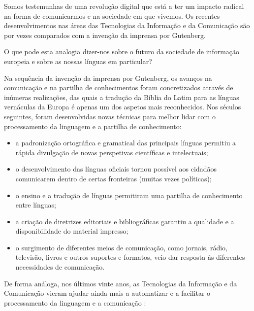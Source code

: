 \begin{multicols}{2}

Somos testemunhas de uma revolução digital que está a ter um impacto radical na forma de comunicarmos e na sociedade em que vivemos. 
Os recentes desenvolvimentos nas áreas das Tecnologias da Informação e da Comunicação são por vezes comparados com a invenção da imprensa por Gutenberg. 

O que pode esta analogia dizer-nos sobre o futuro da sociedade de informação europeia e sobre as nossas línguas em particular?



Na sequência da invenção da imprensa por Gutenberg, os avanços na comunicação e na partilha de co\-nhe\-ci\-men\-tos foram concretizados através de 
inúmeras realizações, das quais a tradução da Bíblia do Latim para as línguas vernáculas da Europa é apenas um dos aspetos
mais reconhecidos. Nos séculos seguintes, foram desenvolvidas novas técnicas para melhor lidar com o processamento da linguagem 
e a partilha de co\-nhe\-ci\-men\-to:

\medskip
\begin{itemize}
   \item a padronização ortográfica e gramatical das principais línguas permitiu a rápida divulgação de novas perspetivas científicas e intelectuais;
      \item o desenvolvimento das línguas oficiais tornou possível aos cidadãos comunicarem dentro de certas fronteiras (muitas vezes políticas);
      \item o ensino e a tradução de línguas permitiram uma partilha de co\-nhe\-ci\-men\-to entre línguas;
      \item a criação de diretrizes editoriais e bibliográficas garantiu a qualidade e a disponibilidade do material impresso;
      \item o surgimento de diferentes meios de comunicação, como jornais, rádio, televisão, livros e outros suportes e formatos, veio dar resposta às diferentes necessidades de comunicação. 
\end{itemize}


 De forma análoga, nos últimos vinte anos, as Tecnologias da Informação e da Comunicação vieram ajudar ainda mais 
a automatizar e a facilitar o processamento da linguagem e a comunicação :


\end{multicols}
